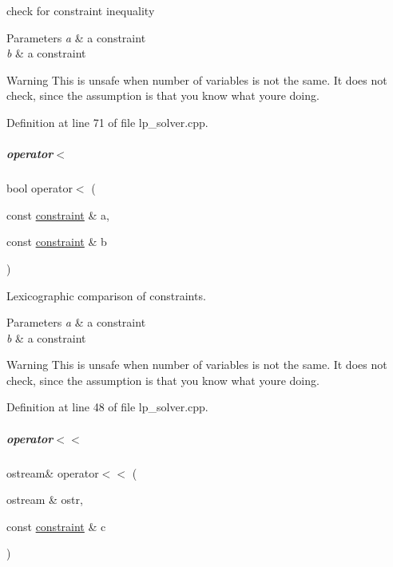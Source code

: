 check for constraint inequality 


\begin{DoxyParams}{Parameters}
{\em a} & a constraint \\
\hline
{\em b} & a constraint \\
\hline
\end{DoxyParams}
\begin{DoxyWarning}{Warning}
This is unsafe when number of variables is not the same. It does not check, since the assumption is that you know what you\textquotesingle{}re doing. 
\end{DoxyWarning}


Definition at line 71 of file lp\+\_\+solver.\+cpp.

\mbox{\label{group___c_l_s_solvers_aecc988c4f28198ecc105f60eddfbfddc}} 
\subparagraph{\texorpdfstring{operator$<$}{operator<}}
{\footnotesize\ttfamily bool operator$<$ (\begin{DoxyParamCaption}\item[{const \hyperlink{group___c_l_s_solvers_classconstraint}{constraint} \&}]{a,  }\item[{const \hyperlink{group___c_l_s_solvers_classconstraint}{constraint} \&}]{b }\end{DoxyParamCaption})\hspace{0.3cm}{\ttfamily [friend]}}



Lexicographic comparison of constraints. 


\begin{DoxyParams}{Parameters}
{\em a} & a constraint \\
\hline
{\em b} & a constraint \\
\hline
\end{DoxyParams}
\begin{DoxyWarning}{Warning}
This is unsafe when number of variables is not the same. It does not check, since the assumption is that you know what you\textquotesingle{}re doing. 
\end{DoxyWarning}


Definition at line 48 of file lp\+\_\+solver.\+cpp.

\mbox{\label{group___c_l_s_solvers_a829b1dbba361c34d021ebe82ccf5cb7f}} 
\subparagraph{\texorpdfstring{operator$<$$<$}{operator<<}}
{\footnotesize\ttfamily ostream\& operator$<$$<$ (\begin{DoxyParamCaption}\item[{ostream \&}]{ostr,  }\item[{const \hyperlink{group___c_l_s_solvers_classconstraint}{constraint} \&}]{c }\end{DoxyParamCaption})\hspace{0.3cm}{\ttfamily [friend]}}




